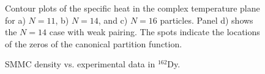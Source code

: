 \documentclass[rmp,preprint,aps,floatfix]{revtex4}
\begin{document}
\begin{figure}
\caption{Contour plots of the specific heat in the complex temperature plane
for a) $N=11$, b) $N=14$, and c) $N=16$ particles. Panel d) 
shows the $N=14$ case with weak pairing.  
The spots indicate the locations of the 
zeros of the canonical partition function.} 
\label{fig:contourplot}
\end{figure}


\begin{figure}
\caption{SMMC density vs. experimental
data in $^{162}$Dy.
\label{fig:dy162}}
\end{figure}
\end{document}
